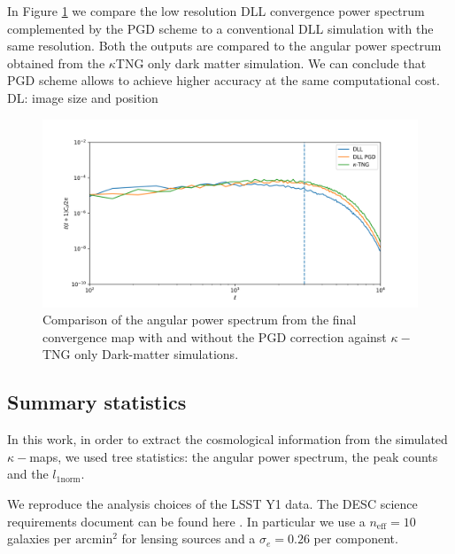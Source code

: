 \documentclass[twocolumn,twocolappendix]{aastex63}
\newcommand{\denise}[1]{{\color{red}DL: #1}}
\begin{document}
In Figure \ref{fig:ps_comp} we compare the low resolution DLL convergence power spectrum complemented by the PGD scheme to a conventional DLL simulation with the same resolution. Both the outputs are compared to the angular power spectrum obtained from the $\kappa$TNG only dark matter simulation. We can conclude that PGD scheme allows to achieve higher accuracy at the same computational cost.
\denise{image size and position}
\begin{figure}
    \centering
    \includegraphics[width=\columnwidth]{paper/figures/ps_comp.png}
    \caption{Comparison of the angular power spectrum from the final convergence map with and without the PGD correction against $\kappa-$TNG only Dark-matter simulations.}
    \label{fig:ps_comp}
\end{figure}



\subsection{Summary statistics}
In this work, in order to extract the cosmological information from the simulated $\kappa-$maps, we used tree statistics: the angular power spectrum, the peak counts and the $l_{1\text{norm}}$. 

We reproduce the analysis choices of the LSST Y1 data. The DESC science requirements document can be found here \cite{mandelbaum2018lsst}.
In particular we use a $n_{\text{eff}}=10$ galaxies per $\text{arcmin}^2$ for lensing sources and a $\sigma_e=0.26$ per component.
\end{document}
